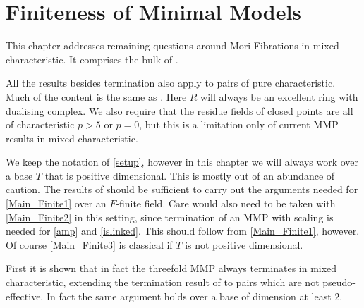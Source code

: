 %
%
%
%
%
%

\chapter{Finiteness of Minimal Models}\label{Finite}
	
	This chapter addresses remaining questions around Mori Fibrations in mixed characteristic. It comprises the bulk of \cite{stigant2021mori}.
	
	All the results besides termination also apply to pairs of pure characteristic. Much of the content is the same as \cite{stigant2021mori}. Here $R$ will always be an excellent ring with dualising complex. We also require that the residue fields of closed points are all of characteristic $p>5$ or $p=0$, but this is a limitation only of current MMP results in mixed characteristic.
	
	We keep the notation of \autoref{setup}, however in this chapter we will always work over a base $T$ that is positive dimensional. This is mostly out of an abundance of caution. The results of \cite{DW19} should be sufficient to carry out the arguments needed for \autoref{Main_Finite1} over an $F$-finite field. Care would also need to be taken with \autoref{Main_Finite2} in this setting, since termination of an MMP with scaling is needed for \autoref{amp} and \autoref{islinked}. This should follow from \autoref{Main_Finite1}, however. Of course \autoref{Main_Finite3} is classical if $T$ is not positive dimensional.
	
	First it is shown that in fact the threefold MMP always terminates in mixed characteristic, extending the termination result of \cite{bhatt2020} to pairs which are not pseudo-effective. In fact the same argument holds over a base of dimension at least $2$.
	
